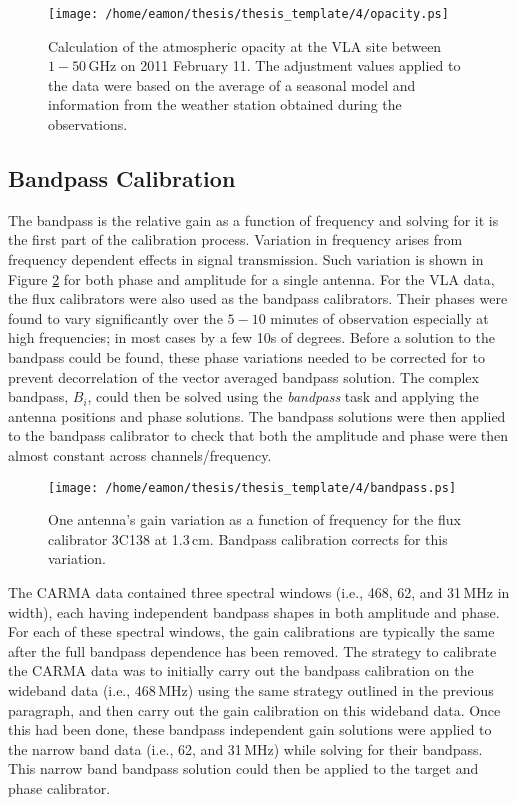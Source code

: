 \begin{figure}[hbt!]
\centering 
\texttt{[image: /home/eamon/thesis/thesis\_template/4/opacity.ps]}  
\caption[Atmospheric opacity at the VLA site.]{Calculation of the atmospheric opacity at the VLA site between $1-50$\,GHz on 2011 February 11. The adjustment values applied to the data were based on the average of a seasonal model and information from the weather station obtained during the observations.}
\label{fig:4.4}
\end{figure}

\subsection{Bandpass Calibration}
The bandpass is the relative gain as a function of frequency and solving for it is the first part of the calibration process. Variation in frequency arises from frequency dependent effects in signal transmission. Such variation is shown in Figure \ref{fig:4.5} for both phase and amplitude for a single antenna. For the VLA data, the flux calibrators were also used as the bandpass calibrators. Their phases were found to vary significantly over the $5-10$ minutes of observation especially at high frequencies; in most cases by a few 10s of degrees. Before a solution to the bandpass could be found, these phase variations needed to be corrected for to prevent decorrelation of the vector averaged bandpass solution. The complex bandpass, $B_i$, could then be solved using the \textit{bandpass} task and applying the antenna positions and phase solutions. The bandpass solutions  were then applied to the bandpass calibrator to check that both the amplitude and phase were then almost constant across channels/frequency.

\begin{figure}[hbt!]
\centering 
\texttt{[image: /home/eamon/thesis/thesis\_template/4/bandpass.ps]}  
\caption[Gain variation as a function of frequency.]{One antenna's gain variation as a function of frequency for the flux calibrator 3C138 at 1.3\,cm. Bandpass calibration corrects for this variation.}
\label{fig:4.5}
\end{figure}

The CARMA data contained three spectral windows (i.e., 468, 62, and 31\,MHz in width), each having independent bandpass shapes in both amplitude and phase. For each of these spectral windows, the gain calibrations are typically the same  after the full bandpass dependence has been removed. The strategy to calibrate the CARMA data was to initially carry out the bandpass calibration on the wideband data (i.e., 468\,MHz) using the same strategy outlined in the previous paragraph, and then carry out the gain calibration on this wideband data. Once this had been done, these bandpass independent gain solutions were applied to the narrow band data (i.e., 62, and 31\,MHz) while solving for their bandpass. This narrow band bandpass solution could then be applied to the target and phase calibrator.


